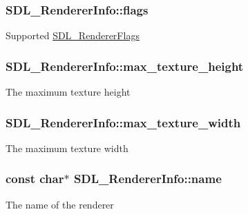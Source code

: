 \subsubsection[{\texorpdfstring{flags}{flags}}]{ S\+D\+L\+\_\+\+Renderer\+Info\+::flags}\hypertarget{struct_s_d_l___renderer_info_a95cf0ffd1704fd0a4dd8ceac6c9f0542}{}\label{struct_s_d_l___renderer_info_a95cf0ffd1704fd0a4dd8ceac6c9f0542}
Supported \hyperlink{_s_d_l__render_8h_a3a6e51bbee5fd3f8ee0c9f7504ae4130}{S\+D\+L\+\_\+\+Renderer\+Flags} 
\subsubsection[{\texorpdfstring{max\+\_\+texture\+\_\+height}{max_texture_height}}]{ S\+D\+L\+\_\+\+Renderer\+Info\+::max\+\_\+texture\+\_\+height}\hypertarget{struct_s_d_l___renderer_info_a87c6a13e8d535c2148f8913c05e13102}{}\label{struct_s_d_l___renderer_info_a87c6a13e8d535c2148f8913c05e13102}
The maximum texture height 
\subsubsection[{\texorpdfstring{max\+\_\+texture\+\_\+width}{max_texture_width}}]{ S\+D\+L\+\_\+\+Renderer\+Info\+::max\+\_\+texture\+\_\+width}\hypertarget{struct_s_d_l___renderer_info_a6e6757e3d5c1f0922adaba39380edfa6}{}\label{struct_s_d_l___renderer_info_a6e6757e3d5c1f0922adaba39380edfa6}
The maximum texture width 
\subsubsection[{\texorpdfstring{name}{name}}]{\setlength{\rightskip}{0pt plus 5cm}const char$\ast$ S\+D\+L\+\_\+\+Renderer\+Info\+::name}\hypertarget{struct_s_d_l___renderer_info_a433ecb2865c81ba9f28038e56a4ae6f3}{}\label{struct_s_d_l___renderer_info_a433ecb2865c81ba9f28038e56a4ae6f3}
The name of the renderer 
